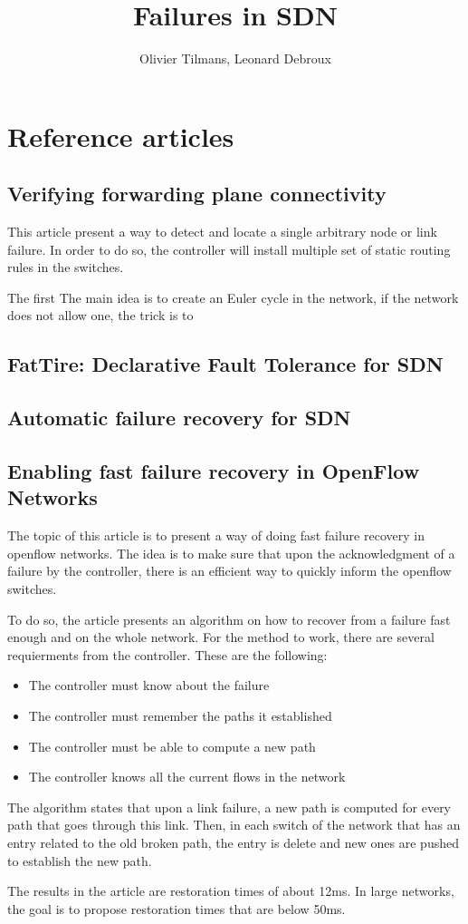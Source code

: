 \documentclass[11pt,a4paper]{article}
\author{Olivier Tilmans, Leonard Debroux}
\title{Failures in SDN}
\begin{document}
\section{Reference articles}
\subsection{Verifying forwarding plane connectivity}
This article present a way to detect and locate a single arbitrary node or link failure.
In order to do so, the controller will install multiple set of static routing rules in the switches.

The first
The main idea is to create an Euler cycle in the network, if the network does not allow one, the trick is to 
\subsection{FatTire: Declarative Fault Tolerance for SDN}

\subsection{Automatic failure recovery for SDN}

\subsection{Enabling fast failure recovery in OpenFlow Networks}
The topic of this article is to present a way of doing fast failure recovery in openflow networks.
The idea is to make sure that upon the acknowledgment of a failure by the controller, there is an efficient way to quickly inform the openflow switches.

To do so, the article presents an algorithm on how to recover from a failure fast enough and on the whole network.
For the method to work, there are several requierments from the controller. These are the following:
\begin{itemize}
	\item The controller must know about the failure
	\item The controller must remember the paths it established
	\item The controller must be able to compute a new path
	\item The controller knows all the current flows in the network
\end{itemize}
The algorithm states that upon a link failure, a new path is computed for every path that goes through this link.
Then, in each switch of the network that has an entry related to the old broken path, the entry is delete and new ones are pushed to establish the new path.

The results in the article are restoration times of about 12ms. In large networks, the goal is to propose restoration times that are below 50ms. 
\end{document}

